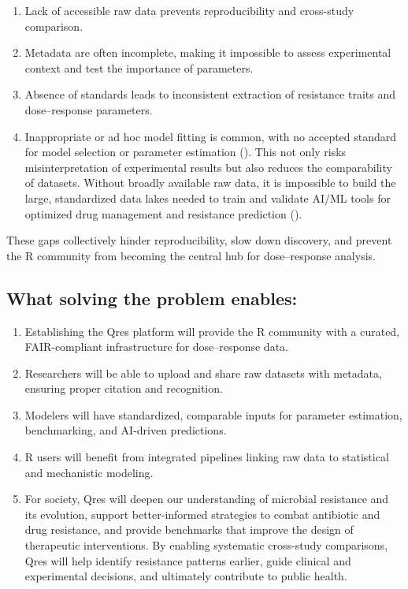 \documentclass[
]{article}
\providecommand{\tightlist}{%
  \setlength{\itemsep}{0pt}\setlength{\parskip}{0pt}}
\begin{document}
\begin{enumerate}
\def\labelenumi{\arabic{enumi}.}
\tightlist
\item
  Lack of accessible raw data prevents reproducibility and cross-study
  comparison.
\item
  Metadata are often incomplete, making it impossible to assess
  experimental context and test the importance of parameters.
\item
  Absence of standards leads to inconsistent extraction of resistance
  traits and dose--response parameters.
\item
  Inappropriate or ad hoc model fitting is common, with no accepted
  standard for model selection or parameter estimation
  (). This not only risks
  misinterpretation of experimental results but also reduces the
  comparability of datasets. Without broadly available raw data, it is
  impossible to build the large, standardized data lakes needed to train
  and validate AI/ML tools for optimized drug management and resistance
  prediction ().
\end{enumerate}

These gaps collectively hinder reproducibility, slow down discovery, and
prevent the R community from becoming the central hub for dose--response
analysis.

\subsection{What solving the problem
enables:}\label{what-solving-the-problem-enables}

\begin{enumerate}
\def\labelenumi{\arabic{enumi}.}
\tightlist
\item
  Establishing the Qres platform will provide the R community with a
  curated, FAIR-compliant infrastructure for dose--response data.
\item
  Researchers will be able to upload and share raw datasets with
  metadata, ensuring proper citation and recognition.
\item
  Modelers will have standardized, comparable inputs for parameter
  estimation, benchmarking, and AI-driven predictions.
\item
  R users will benefit from integrated pipelines linking raw data to
  statistical and mechanistic modeling.
\item
  For society, Qres will deepen our understanding of microbial
  resistance and its evolution, support better-informed strategies to
  combat antibiotic and drug resistance, and provide benchmarks that
  improve the design of therapeutic interventions. By enabling
  systematic cross-study comparisons, Qres will help identify resistance
  patterns earlier, guide clinical and experimental decisions, and
  ultimately contribute to public health.
\end{enumerate}
\end{document}
